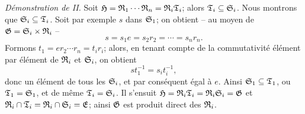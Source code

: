 \emph{Démonstration de II.} Soit $\mathfrak{H}=\mathfrak{R}_1\cdots\mathfrak{R}_n=\mathfrak{R}_i\mathfrak{T}_i$; alors $\mathfrak{T}_i\subseteq\mathfrak{S}_i$. Nous montrons que $\mathfrak{S}_i\subseteq\mathfrak{T}_i$. Soit par exemple $s$ dans $\mathfrak{S}_1$; on obtient -- au moyen de $\mathfrak{G}=\mathfrak{S}_i\times\mathfrak{R}_i$ --
\[
        s=s_1e=s_2r_2=\cdots=s_nr_n.
\]
Formons $t_1=er_2\cdots r_n=t_ir_i$; alors, en tenant compte de la commutativité élément par élément de $\mathfrak{R}_i$ et $\mathfrak{S}_i$, on obtient
\[
        st_1^{-1}=s_it_i^{-1},
\]
donc un élément de tous les $\mathfrak{S}_i$, et par conséquent égal à $e$. Ainsi $\mathfrak{S}_1\subseteq\mathfrak{T}_1$, ou $\mathfrak{T}_1=\mathfrak{S}_1$, et de même $\mathfrak{T}_i=\mathfrak{S}_i$. Il s'ensuit $\mathfrak{H}=\mathfrak{R}_i\mathfrak{T}_i=\mathfrak{R}_i\mathfrak{S}_i=\mathfrak{G}$ et $\mathfrak{R}_i\cap\mathfrak{T}_i=\mathfrak{R}_i\cap\mathfrak{S}_i=\mathfrak{E}$; ainsi $\mathfrak{G}$ est produit direct des $\mathfrak{R}_i$.
